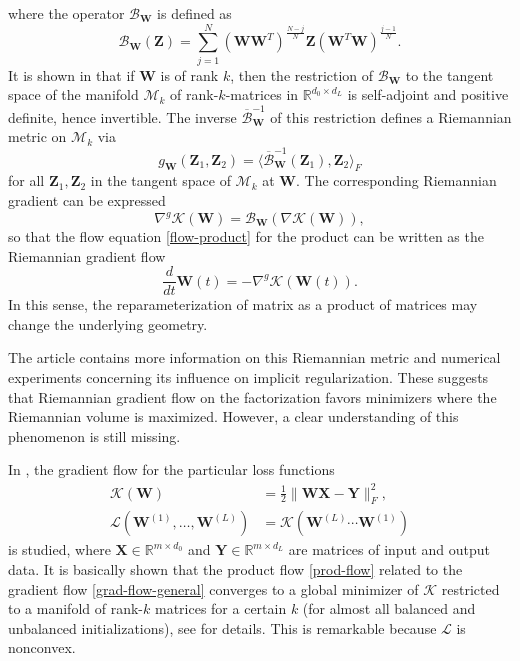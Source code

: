 \documentclass{svproc}
\newcommand{\bW}{\boldsymbol{W}}
\newcommand{\bx}{\boldsymbol{x}}
\newcommand{\bX}{\boldsymbol{X}}
\newcommand{\bY}{\boldsymbol{Y}}
\newcommand{\bZ}{\boldsymbol{Z}}
\newcommand{\0}{\boldsymbol{0}}
\newcommand{\1}{\boldsymbol{1}}
\def\R{\mathbb{R}}
\def\GF{\text{GF}}
\def\Lln{\mathcal{L}_\text{ln}}
\begin{document}
where the operator $\mathcal{B}_{\bW}$ is defined as
\[
\mathcal{B}_{\bW}(\bZ) = \sum_{j=1}^N (\bW \bW^T)^{\frac{N-j}{N}} \bZ  (\bW^T \bW)^{\frac{j-1}{N}}.
\]
It is shown in \cite{Bah2021learning} that if $\bW$ is of rank $k$, then the restriction of $\mathcal{B}_{\bW}$
to the tangent space of the manifold $\mathcal{M}_k$ of rank-$k$-matrices in $\R^{d_0 \times d_L}$ is self-adjoint and positive definite, hence invertible. The inverse $\overline{\mathcal{B}}_{\bW}^{-1}$ of this restriction defines a Riemannian metric on $\mathcal{M}_k$
via
\[
g_{\bW}(\bZ_1,\bZ_2) = \langle \overline{\mathcal{B}}_{\bW}^{-1}(\bZ_1),\bZ_2\rangle_F
\]
for all $\bZ_1,\bZ_2$ in the tangent space of $\mathcal{M}_k$ at $\bW$. The corresponding Riemannian gradient can be expressed
\[
\nabla^g \mathcal{K}(\bW) = \mathcal{B}_{\bW}(\nabla \mathcal{K}(\bW)),
\]
so that the flow equation \eqref{flow-product} for the product can be written as the Riemannian gradient flow
\[
\frac{d}{dt} \bW(t) = - 
\nabla^g \mathcal{K}(\bW(t)).
\]
In this sense, the reparameterization of matrix as a product of matrices may change the underlying geometry.

The article \cite{comeve23} contains more information on this Riemannian metric and numerical experiments concerning its influence on implicit regularization. These suggests that Riemannian gradient flow on the factorization favors minimizers where the Riemannian volume is maximized. However, a clear understanding of this phenomenon is still missing.

In \cite{Bah2021learning}, the gradient flow for the particular loss functions
\begin{align*}
\mathcal{K}(\bW) &= \frac{1}{2}\|\bW \bX - \bY\|_F^2, \\
\mathcal{L}(\bW^{(1)},\hdots,\bW^{(L)}) & = \mathcal{K}(\bW^{(L)}\cdots \bW^{(1)})
\end{align*}
is studied, where $\bX \in \R^{m \times d_0}$ and $\bY \in \R^{m \times d_L}$ are matrices of input and output data.
It is basically shown that the product flow \eqref{prod-flow} related to the gradient flow \eqref{grad-flow-general} converges to a global minimizer of $\mathcal{K}$ restricted to a manifold of rank-$k$ matrices for a certain $k$ (for almost all balanced and unbalanced initializations), see \cite{Bah2021learning} for details. This is remarkable because $\mathcal{L}$ is nonconvex.






\end{document}
